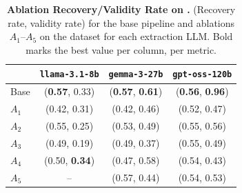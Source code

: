 \begin{table}[ht]
  \small
  \setlength{\tabcolsep}{4pt}
  \centering
  \begin{tabular}{l ccc}
    \toprule
    & \texttt{llama-3.1-8b} & \texttt{gemma-3-27b} & \texttt{gpt-oss-120b} \\
    \midrule
    Base & (\textbf{0.57}, 0.33) & (\textbf{0.57}, \textbf{0.61}) & (\textbf{0.56}, \textbf{0.96}) \\
    $A_1$ & (0.42, 0.31) & (0.42, 0.46) & (0.52, 0.47) \\
    $A_2$ & (0.55, 0.25) & (0.53, 0.49) & (0.55, 0.56) \\
    $A_3$ & (0.49, 0.19) & (0.49, 0.37) & (0.55, 0.49) \\
    $A_4$ & (0.50, \textbf{0.34}) & (0.47, 0.58) & (0.54, 0.43) \\
    $A_5$ & -- & (0.57, 0.44) & (0.54, 0.53) \\
    \bottomrule
  \end{tabular}
  \caption{\textbf{Ablation Recovery/Validity Rate on \supermat.} (Recovery rate, validity rate) for the base pipeline and ablations $A_1$--$A_5$ on the \supermat dataset for each extraction LLM. Bold marks the best value per column, per metric.}
  \label{tab:ablation_supermat}
\end{table}
